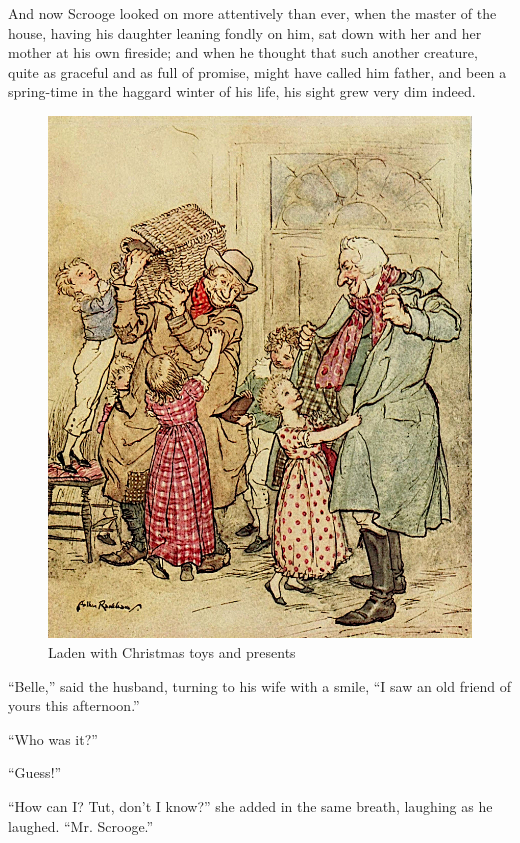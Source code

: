 \documentclass[paper=a5,BCOR=15mm,twoside,DIV=15,headinclude=off,12pt,chapterprefix=off,openany,headings=huge]{scrbook} %
\begin{document}
And now Scrooge looked on more attentively than ever, when the master of the house, having his daughter leaning fondly on him, sat down with her and her mother at his own fireside; and when he thought that such another creature, quite as graceful and as full of promise, might have called him father, and been a spring-time in the haggard winter of his life, his sight grew very dim indeed.

\begin{figure}[p]
\begin{minipage}[c]{\linewidth}
\includegraphics[width=\linewidth]{prezziesimproved}
\caption*{Laden with Christmas toys and presents}
\end{minipage}
\end{figure}

\enquote{Belle,} said the husband, turning to his wife with a smile, \enquote{I saw an old friend of yours this afternoon.}

\enquote{Who was it?}

\enquote{Guess!}

\enquote{How can I? Tut, don't I know?} she added in the same breath, laughing as he laughed. \enquote{Mr. Scrooge.}
\end{document}
